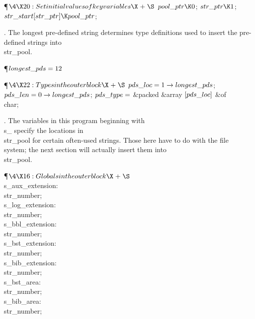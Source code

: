 \Y\P$\4\X20:Set initial values of key variables\X\mathrel{+}\S$\6
$\\{pool\_ptr}\K0$;\5
$\\{str\_ptr}\K1$;\6
$\\{str\_start}[\\{str\_ptr}]\K\\{pool\_ptr}$;\par
\fi

.
The longest pre-defined string determines type definitions used to
insert the pre-defined strings into \\{str\_pool}.

\Y\P\D {}$\\{longest\_pds}=12$\par
\Y\P$\4\X22:Types in the outer block\X\mathrel{+}\S$\6
$\\{pds\_loc}=1\to\\{longest\_pds}$;\5
$\\{pds\_len}=0\to\\{longest\_pds}$;\5
$\\{pds\_type}=$\1\5
\&{packed} \&{array} $[\\{pds\_loc}]$ \1\&{of}\5
\\{char};\2\2\par
\fi

.
The variables in this program beginning with \\{s\_} specify the
locations in \\{str\_pool} for certain often-used strings.  Those here
have to do with the file system; the next section will actually insert
them into \\{str\_pool}.

\Y\P$\4\X16:Globals in the outer block\X\mathrel{+}\S$\6
\4\\{s\_aux\_extension}: \\{str\_number};\6
\4\\{s\_log\_extension}: \\{str\_number};\6
\4\\{s\_bbl\_extension}: \\{str\_number};\6
\4\\{s\_bst\_extension}: \\{str\_number};\6
\4\\{s\_bib\_extension}: \\{str\_number};\6
\4\\{s\_bst\_area}: \\{str\_number};\6
\4\\{s\_bib\_area}: \\{str\_number};\par
\fi

